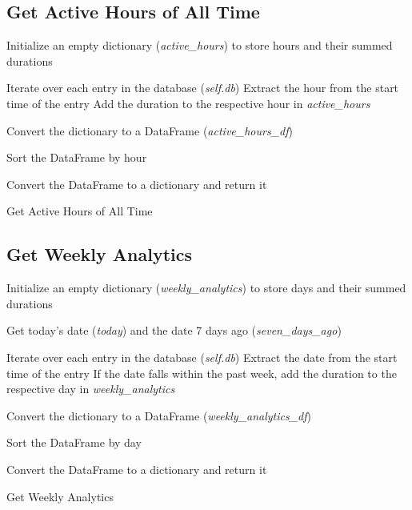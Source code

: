 \documentclass[openany]{report}
\begin{document}
\subsection{Get Active Hours of All Time}

\begin{algorithm}[H]
    \SetAlgoLined
    \BlankLine

    Initialize an empty dictionary (\textit{active\_hours}) to store hours and their summed durations\;

    Iterate over each entry in the database (\textit{self.db})\;
    \Indp
    Extract the hour from the start time of the entry\;
    Add the duration to the respective hour in \textit{active\_hours}\;
    \Indm

    Convert the dictionary to a DataFrame (\textit{active\_hours\_df})\;

    Sort the DataFrame by hour\;

    Convert the DataFrame to a dictionary and return it\;
    \BlankLine

    \caption{Get Active Hours of All Time}
\end{algorithm}

\subsection{Get Weekly Analytics}

\begin{algorithm}[H]
    \SetAlgoLined
    \BlankLine

    Initialize an empty dictionary (\textit{weekly\_analytics}) to store days and their summed durations\;

    Get today's date (\textit{today}) and the date 7 days ago (\textit{seven\_days\_ago})\;

    Iterate over each entry in the database (\textit{self.db})\;
    \Indp
    Extract the date from the start time of the entry\;
    If the date falls within the past week, add the duration to the respective day in \textit{weekly\_analytics}\;
    \Indm

    Convert the dictionary to a DataFrame (\textit{weekly\_analytics\_df})\;

    Sort the DataFrame by day\;

    Convert the DataFrame to a dictionary and return it\;
    \BlankLine

    \caption{Get Weekly Analytics}
\end{algorithm}
\end{document}
